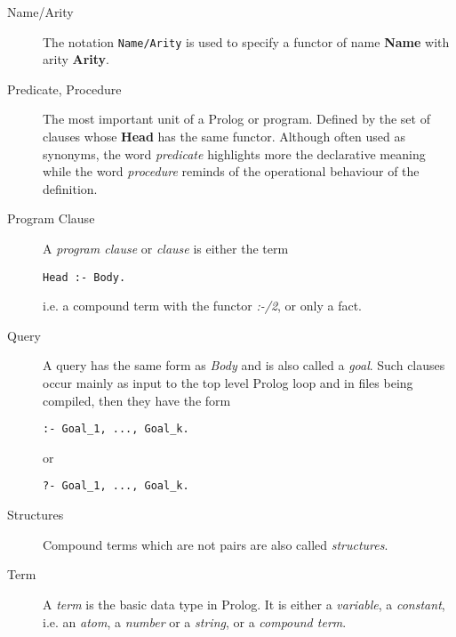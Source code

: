 \begin{description}
\item[Name/Arity]
The notation {\tt Name/Arity} is used to specify a functor of name 
{\bf Name} with arity {\bf Arity}.

\item[Predicate, Procedure]
The most important unit of a Prolog or {\eclipse} program.
Defined by the set of clauses whose {\bf Head} has the same functor.
Although often used as synonyms, the word {\it predicate}
highlights more the declarative meaning while the word {\it procedure}
reminds of the operational behaviour of the definition.


\item[Program Clause]
A {\it program clause} or {\it clause} is either the term
\begin{verbatim}
Head :- Body.
\end{verbatim}
i.e. a compound term with the functor {\it :-/2}, or only a fact.

\item[Query]
A query  has the same form as {\it Body} 	
and is also called a {\it goal}.
Such clauses occur mainly as input to the top level Prolog loop
and in files being compiled, then they have the form
\begin{verbatim}
:- Goal_1, ..., Goal_k.
\end{verbatim}
or
\begin{verbatim}
?- Goal_1, ..., Goal_k.
\end{verbatim}

\item[Structures]
Compound terms which are not pairs are also called {\it structures}.

\item[Term]
A {\it term} is the basic data type in Prolog.
It is either a {\it variable}, a {\it constant},
i.e. an {\it atom}, a {\it number} or a {\it string},
or a {\it compound term}.


\end{description}
